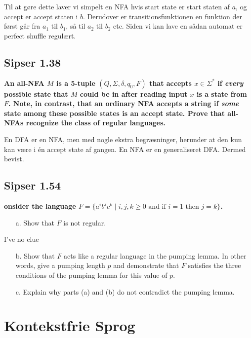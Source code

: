 Til at gøre dette laver vi simpelt en NFA hvis start state er start staten af $a$, og accept er accept staten i $b$. Derudover er transitionsfunktionen en funktion der først går fra $a_{1}$ til $b_{1}$, så til $a_{2}$ til $b_{2}$ etc. Siden vi kan lave en sådan automat er perfect shuffle regulært.

\subsection*{Sipser 1.38}%
\label{subsec:sipser1.38}

\textbf{An all-NFA $M$ is a 5-tuple $(Q, \Sigma, \delta, q_{0}, F)$ that accepts $x \in \Sigma^{*}$ if \textit{every} possible state that $M$ could be in after reading input $x$ is a state from $F$. Note, in contrast, that an ordinary   NFA accepts a string if \textit{some} state among these possible states is an accept state. Prove that all-NFAs recognize the class of regular languages.}

En DFA er en NFA, men med nogle ekstra begræsninger, herunder at den kun kan være i én accept state af gangen. En NFA er en generaliseret DFA. Dermed bevist.

\subsection*{Sipser 1.54}%
\label{subsec:sipser1.54}
\textbf{onsider the language \( F = \{a^i b^j c^k \mid i,j,k \geq 0 \text{ and if } i = 1 \text{ then } j = k\} \).}

\begin{enumerate}
	\item[a.] Show that \( F \) is not regular.
\end{enumerate}

I've no clue

\begin{enumerate}
	\item[b.] Show that \( F \) acts like a regular language in the pumping lemma. In other words, give a pumping length \( p \) and demonstrate that \( F \) satisfies the three conditions of the pumping lemma for this value of \( p \).
\end{enumerate}
\begin{enumerate}
	\item[c.] Explain why parts (a) and (b) do not contradict the pumping lemma.
\end{enumerate}

\section{Kontekstfrie Sprog}
\label{sec:2exercises}

